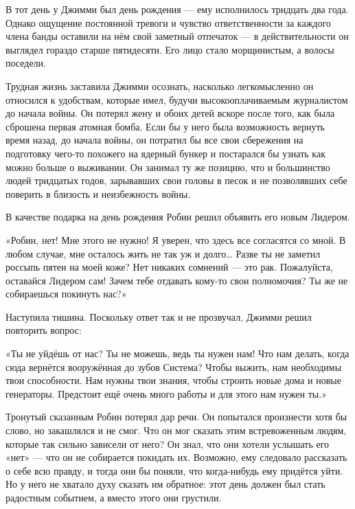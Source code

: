 \documentclass[a4paper,12pt]{book}
\begin{document}
\par
В тот день у Джимми был день рождения — ему исполнилось тридцать два года. Однако ощущение постоянной тревоги и чувство ответственности за каждого члена банды оставили на нём свой заметный отпечаток — в действительности он выглядел гораздо старше пятидесяти. Его лицо стало морщинистым, а волосы поседели.
\par
Трудная жизнь заставила Джимми осознать, насколько легкомысленно он относился к удобствам, которые имел, будучи высокооплачиваемым журналистом до начала войны. Он потерял жену и обоих детей вскоре после того, как была сброшена первая атомная бомба. Если бы у него была возможность вернуть время назад, до начала войны, он потратил бы все свои сбережения на подготовку чего-то похожего на ядерный бункер и постарался бы узнать как можно больше о выживании. Он занимал ту же позицию, что и большинство людей тридцатых годов, зарывавших свои головы в песок и не позволявших себе поверить в близость и неизбежность войны.
\par
В качестве подарка на день рождения Робин решил объявить его новым Лидером.\\
\par
«Робин, нет! Мне этого не нужно! Я уверен, что здесь все согласятся со мной. В любом случае, мне осталось жить не так уж и долго… Разве ты не заметил россыпь пятен на моей коже? Нет никаких сомнений — это рак. Пожалуйста, оставайся Лидером сам! Зачем тебе отдавать кому-то свои полномочия? Ты же не собираешься покинуть нас?»
\par
Наступила тишина. Поскольку ответ так и не прозвучал, Джимми решил повторить вопрос:
\par
«Ты не уйдёшь от нас? Ты не можешь, ведь ты нужен нам! Что нам делать, когда сюда вернётся вооружённая до зубов Система? Чтобы выжить, нам необходимы твои способности. Нам нужны твои знания, чтобы строить новые дома и новые генераторы. Предстоит ещё очень много работы и для этого нам нужен ты.»
\par
Тронутый сказанным Робин потерял дар речи. Он попытался произнести хотя бы слово, но закашлялся и не смог. Что он мог сказать этим встревоженным людям, которые так сильно зависели от него? Он знал, что они хотели услышать его «нет» — что он не собирается покидать их. Возможно, ему следовало рассказать о себе всю правду, и тогда они бы поняли, что когда-нибудь ему придётся уйти. Но у него не хватало духу сказать им обратное: этот день должен был стать радостным событием, а вместо этого они грустили.
\par
\end{document}
